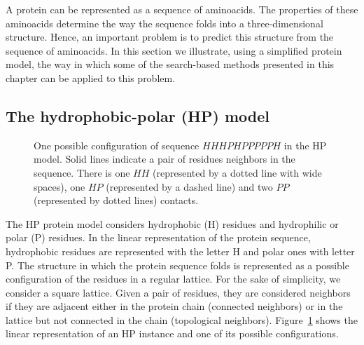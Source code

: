  A protein can be represented as a sequence of aminoacids. The properties of these aminoacids determine the way the sequence folds into a three-dimensional structure. Hence, an important problem is to predict this structure from the sequence of aminoacids. In this section we illustrate, using a simplified protein model, the way in which some of the search-based methods presented in this chapter can be applied to this problem. 

 \subsection{The hydrophobic-polar (HP) model}

\begin{figure}[htbp]
 \begin{center}
%
%
%
%
 
    \caption{One possible configuration of  sequence  $HHHPHPPPPPH$  in   the HP model. Solid lines indicate a pair of residues neighbors in the sequence. There is   one $HH$ (represented by a dotted line with wide spaces), one $HP$ (represented by a dashed line) and  two $PP$ (represented by dotted lines) contacts.}
 \label{fig:PROTEXAM}
  \end{center}
\end{figure}




The HP protein model considers  hydrophobic (H) residues  and   hydrophilic or polar (P) residues.   In the linear representation of the protein sequence,  hydrophobic residues are represented with the letter H and polar ones with letter P. The structure in which the protein sequence folds is represented as a possible  configuration of the residues  in a regular lattice. For the sake of simplicity, we consider a square lattice.  Given a pair of residues, they are  considered neighbors if they are adjacent  either in the protein chain  (connected neighbors) or in the lattice but not connected in the chain (topological neighbors). Figure~\ref{fig:PROTEXAM} shows the linear representation of an HP instance and one of its possible configurations. 


